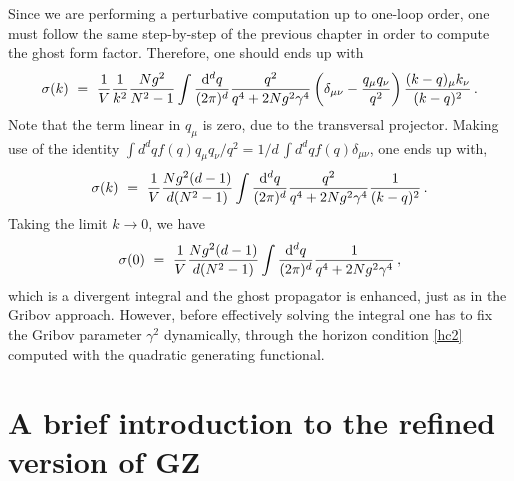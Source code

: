 Since we are performing a perturbative computation up to one-loop order, one must follow the
same step-by-step of the previous chapter in order to compute the ghost form factor. Therefore,
one should ends up with
\begin{eqnarray}
\sigma(k) ~=~ \frac{1}{V}\frac{1}{k^2} \frac{N g^2}{N^2 - 1} \int\frac{ \mathrm{d}^d q}{(2
\pi)^d} \frac{q^2}{q^4 + 2Ng^2\gamma^4} \left(\delta_{\mu\nu} - \frac{q_\mu q_\nu}{q^2}\right)
 \frac{(k-q)_\mu  k_\nu}{(k-q)^2}\,.
\end{eqnarray}
Note that the term linear in $q_{\mu}$ is zero, due to the transversal projector. Making use
of the identity $\int d^{d}q f(q)q_{\mu}q_{\nu}/q^{2} = 1/d\,\int d^{d}q f(q)\delta_{\mu\nu}$,
one ends up with,
\begin{eqnarray}
\sigma(k) ~=~ \frac{1}{V} \frac{N g^2 (d-1)}{d(N^2 - 1)} \int\frac{
\mathrm{d}^d q}{(2 \pi)^d} \frac{q^2}{q^4 + 2Ng^2\gamma^4} \frac{1}{(k-q)^2}\,.
\end{eqnarray}
Taking the limit $k \to 0$, we have
\begin{eqnarray}
\sigma(0) ~=~ \frac{1}{V} \frac{N g^2 (d-1)}{d(N^2 - 1)} \int\frac{
\mathrm{d}^d q}{(2 \pi)^d} \frac{1}{q^4 + 2Ng^2\gamma^4}\,,
\end{eqnarray}
which is a divergent integral and the ghost propagator is enhanced, just as in the Gribov
approach. However, before effectively solving the integral one has to fix the
Gribov parameter $\gamma^{2}$ dynamically, through the horizon condition \eqref{hc2} computed
with the quadratic generating functional. 






\section{A brief introduction to the refined version of GZ}

